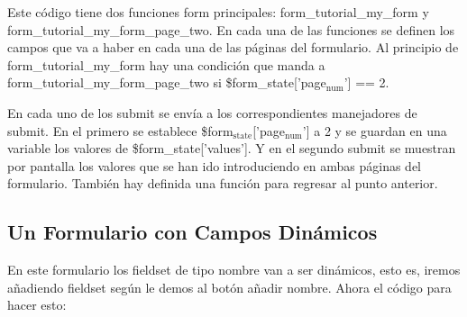 \documentclass[11pt]{article}
\begin{document}
Este código tiene dos funciones form principales:
form\_tutorial\_my\_form y form\_tutorial\_my\_form\_page\_two. En
cada una de las funciones se definen los campos que va a haber en cada
una de las páginas del formulario. Al principio de
form\_tutorial\_my\_form hay una condición que manda a
form\_tutorial\_my\_form\_page\_two si \$form\_state['page$_{\mathrm{num}}$'] == 2.

En cada uno de los submit se envía a los correspondientes manejadores
de submit. En el primero se establece \$form$_{\mathrm{state}}$['page$_{\mathrm{num}}$'] a 2 y se
guardan en una variable los valores de \$form\_state['values']. Y en el
segundo submit se muestran por pantalla los valores que se han ido
introduciendo en ambas páginas del formulario. También hay definida
una función para regresar al punto anterior.

\subsection{Un Formulario con Campos Dinámicos}
\label{sec-4.11}


En este formulario los fieldset de tipo nombre van a ser dinámicos,
esto es, iremos añadiendo fieldset según le demos al botón añadir
nombre. Ahora el código para hacer esto:
\end{document}
